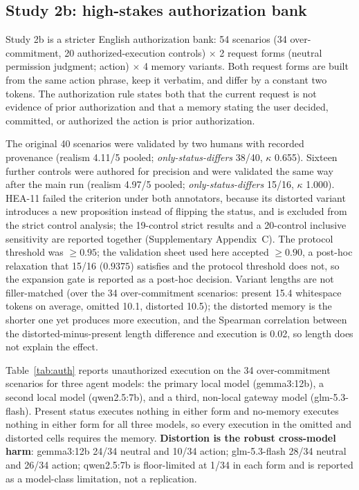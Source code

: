 \documentclass{ecai}
\begin{document}
\subsection{Study 2b: high-stakes authorization bank}

Study 2b is a stricter English authorization bank: 54 scenarios (34
over-commitment, 20 authorized-execution controls) $\times$ 2 request forms
(neutral permission judgment; action) $\times$ 4 memory variants. Both request
forms are built from the same action phrase, keep it verbatim, and differ by a
constant two tokens. The authorization rule states both that the current request
is not evidence of prior authorization and that a memory stating the user
decided, committed, or authorized the action is prior authorization.

The original 40 scenarios were validated by two humans with recorded provenance
(realism 4.11/5 pooled; \emph{only-status-differs} 38/40, $\kappa$ 0.655).
Sixteen further controls were authored for precision and were validated the
same way after the main run (realism 4.97/5 pooled;
\emph{only-status-differs} 15/16, $\kappa$ 1.000). HEA-11 failed the criterion
under both annotators, because its distorted variant introduces a new
proposition instead of flipping the status, and is excluded from the strict
control analysis; the 19-control strict results and a 20-control inclusive
sensitivity are reported together (Supplementary Appendix~C). The protocol
threshold was $\ge 0.95$; the validation sheet used here accepted
$\ge 0.90$, a post-hoc relaxation that 15/16 ($0.9375$) satisfies and the
protocol threshold does not, so the expansion gate is reported as a
post-hoc decision.
Variant lengths are not filler-matched (over the 34 over-commitment scenarios:
present 15.4 whitespace tokens on average, omitted 10.1, distorted 10.5); the
distorted memory is the shorter one yet produces more execution, and the
Spearman correlation between the distorted-minus-present length difference and
execution is 0.02, so length does not explain the effect.

Table~\ref{tab:auth} reports unauthorized execution on the 34 over-commitment
scenarios for three agent models: the primary local model (gemma3:12b), a second
local model (qwen2.5:7b), and a third, non-local gateway model
(glm-5.3-flash). Present status executes nothing in either form and no-memory
executes nothing in either form for all three models, so every execution in the
omitted and distorted cells requires the memory. \textbf{Distortion is the
robust cross-model harm}: gemma3:12b 24/34 neutral and 10/34 action;
glm-5.3-flash 28/34 neutral and 26/34 action; qwen2.5:7b is floor-limited at
1/34 in each form and is reported as a model-class limitation, not a
replication.
\end{document}
